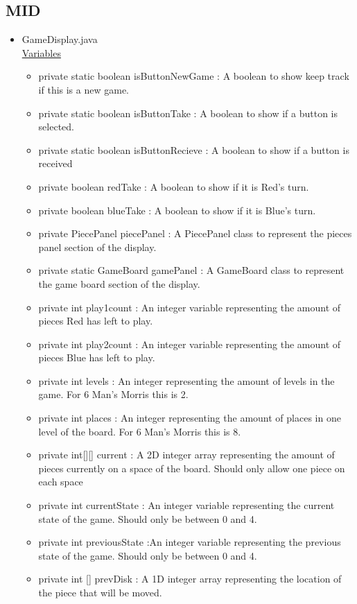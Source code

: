 \documentclass[12pt]{article}
\begin{document}
	\subsection{MID}
	\begin{itemize}
		\item GameDisplay.java \\
		\underline{Variables}
		\begin{itemize}
			\item private static boolean isButtonNewGame : A boolean to show keep track if this is a new game.
			\item private static boolean isButtonTake : A boolean to show if a button is selected.
			\item private static boolean isButtonRecieve : A boolean to show if a button is received
			\item private boolean redTake : A boolean to show if it is Red's turn.
			\item private boolean blueTake : A boolean to show if it is Blue's turn.
			\item private PiecePanel piecePanel : A PiecePanel class to represent the pieces panel section of the display.
			\item private static GameBoard gamePanel : A GameBoard class to represent the game board section of the display.
			\item private int play1count : An integer variable representing the amount of pieces Red has left to play.
			\item private int play2count : An integer variable representing the amount of pieces Blue has left to play.
			\item private int levels : An integer representing the amount of levels in the game. For 6 Man's Morris this is 2.
			\item private int places : An integer representing the amount of places in one level of the board. For 6 Man's Morris this is 8.
			\item private int[][] current : A 2D integer array representing the amount of pieces currently on a space of the board. Should only allow one piece on each space
			\item private int currentState : An integer variable representing the current state of the game. Should only be between 0 and 4.
			\item private int previousState :An integer variable representing the previous state of the game. Should only be between 0 and 4.
			\item private int [] prevDisk : A 1D integer array representing the location of the piece that will be moved.

\end{itemize}
\end{itemize}
\end{document}
